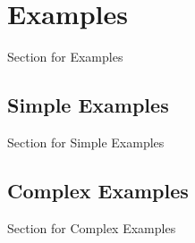 \documentclass{beamer}
\begin{document}
\section{Examples}
\begin{frame}
Section for Examples
\end{frame}

\subsection{Simple Examples}
\begin{frame}
Section for Simple Examples
\end{frame}

\subsection{Complex Examples}
\begin{frame}
Section for Complex Examples
\end{frame}
\end{document}
